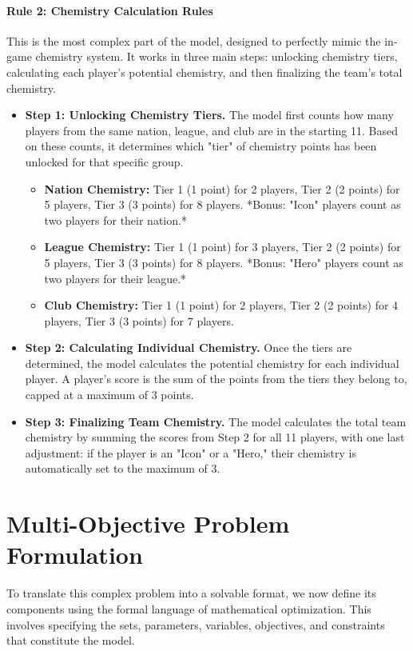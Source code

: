 \documentclass{article}
\begin{document}
\paragraph{Rule 2: Chemistry Calculation Rules}
This is the most complex part of the model, designed to perfectly mimic the in-game chemistry system. It works in three main steps: unlocking chemistry tiers, calculating each player's potential chemistry, and then finalizing the team's total chemistry.
\begin{itemize}
    \item \textbf{Step 1: Unlocking Chemistry Tiers.} The model first counts how many players from the same nation, league, and club are in the starting 11. Based on these counts, it determines which "tier" of chemistry points has been unlocked for that specific group.
    \begin{itemize}
        \item \textbf{Nation Chemistry:} Tier 1 (1 point) for 2 players, Tier 2 (2 points) for 5 players, Tier 3 (3 points) for 8 players. *Bonus: "Icon" players count as two players for their nation.*
        \item \textbf{League Chemistry:} Tier 1 (1 point) for 3 players, Tier 2 (2 points) for 5 players, Tier 3 (3 points) for 8 players. *Bonus: "Hero" players count as two players for their league.*
        \item \textbf{Club Chemistry:} Tier 1 (1 point) for 2 players, Tier 2 (2 points) for 4 players, Tier 3 (3 points) for 7 players.
    \end{itemize}
    \item \textbf{Step 2: Calculating Individual Chemistry.} Once the tiers are determined, the model calculates the potential chemistry for each individual player. A player's score is the sum of the points from the tiers they belong to, capped at a maximum of 3 points.
    \item \textbf{Step 3: Finalizing Team Chemistry.} The model calculates the total team chemistry by summing the scores from Step 2 for all 11 players, with one last adjustment: if the player is an "Icon" or a "Hero," their chemistry is automatically set to the maximum of 3.
\end{itemize}

\section{Multi-Objective Problem Formulation}

To translate this complex problem into a solvable format, we now define its components using the formal language of mathematical optimization. This involves specifying the sets, parameters, variables, objectives, and constraints that constitute the model.
\end{document}
